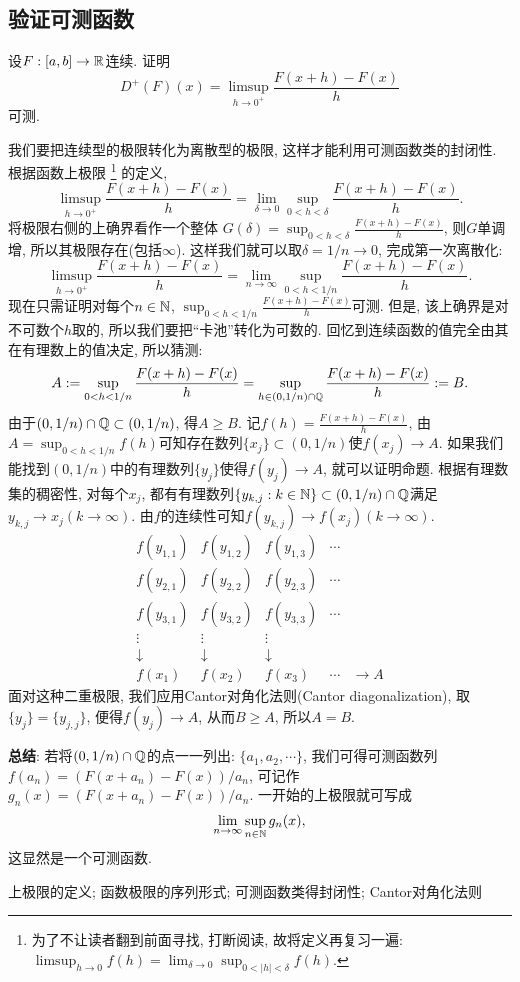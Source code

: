 \subsection{验证可测函数}
\begin{example}[~(Dini导数)] %
    设$F: [a,b] \to \mathbb{R}$连续. 证明
    $$D^+(F)(x) = \limsup_{h \to 0^+}\frac{F(x+h)-F(x)}{h}$$
    可测. 
\end{example}
\begin{solution}
    我们要把连续型的极限转化为离散型的极限, 这样才能利用可测函数类的封闭性. 根据函数上极限
    \footnote{为了不让读者翻到前面寻找, 打断阅读, 故将定义再复习一遍: $\limsup_{h \to 0}f(h) = \lim_{\delta \to  0} \sup_{0<|h|<\delta} f(h)$.}
    的定义,
    $$\limsup_{h \to 0^+}\frac{F(x+h)-F(x)}{h} = 
    \lim_{\delta \to 0}\sup_{0<h<\delta}\frac{F(x+h)-F(x)}{h}.$$
    将极限右侧的上确界看作一个整体
    $\displaystyle{G(\delta)=\sup_{0<h<\delta}\frac{F(x+h)-F(x)}{h} }$, 则$G$单调增, 所以其极限存在(包括$\infty$). 这样我们就可以取$\delta=1/n \to 0$, 完成第一次离散化:
    $$\limsup_{h \to 0^+}\frac{F(x+h)-F(x)}{h} = 
    \lim_{n \to \infty}\sup_{0<h<1/n}\frac{F(x+h)-F(x)}{h}.$$
    现在只需证明对每个$n \in \mathbb{N}$, $\displaystyle{\sup_{0<h<1/n}\frac{F(x+h)-F(x)}{h}}$可测.
    但是, 该上确界是对不可数个$h$取的, 所以我们要把“卡池”转化为可数的. 回忆到连续函数的值完全由其在有理数上的值决定, 所以猜测:
    $$A := \sup_{0<h<1/n}\frac{F(x+h)-F(x)}{h}=\sup_{h \in (0, 1/n) \cap \mathbb{Q}}
    \frac{F(x+h)-F(x)}{h} := B.$$
    由于$(0,1/n)\cap \mathbb{Q} \subset (0, 1/n)$, 得$A \geq B$. 
    记$\displaystyle{f(h)=\frac{F(x+h)-F(x)}{h}}$, 由$A=\sup_{0<h<1/n}f(h)$可知存在数列$\{x_j\} \subset (0,1/n)$使$f(x_j) \to A$. 如果我们能找到$(0,1/n)$中的有理数列$\{y_j\}$使得$f(y_j) \to A$, 就可以证明命题. 根据有理数集的稠密性, 对每个$x_j$, 都有有理数列$\{y_{k,j}:k \in \mathbb{N} \} \subset (0, 1/n) \cap \mathbb{Q}$满足$y_{k,j} \to x_j (k \to \infty)$. 由$f$的连续性可知$f(y_{k,j}) \to f(x_j) (k \to \infty)$. 
    $$\begin{matrix}
        f(y_{1,1}) & f(y_{1,2}) & f(y_{1,3}) & \cdots & \\
        f(y_{2,1}) & f(y_{2,2}) & f(y_{2,3}) & \cdots & \\
        f(y_{3,1}) & f(y_{3,2}) & f(y_{3,3}) & \cdots & \\
        \vdots  & \vdots  & \vdots  &  \\
        \downarrow & \downarrow & \downarrow &  \\
        f(x_1)     & f(x_2)     & f(x_3)     & \cdots & \to A
    \end{matrix}$$
    面对这种二重极限, 我们应用Cantor对角化法则(Cantor diagonalization), 取$\{y_j\}=\{y_{j,j}\}$, 便得$f(y_{j}) \to A$, 从而$B\geq A$, 所以$A=B$. 
\end{solution}
\textbf{总结}: 
    若将$(0,1/n) \cap \mathbb{Q}$的点一一列出: $\{a_1, a_2, \cdots\}$, 我们可得可测函数列
    $f(a_n)=(F(x+a_n)-F(x))/a_n$, 可记作$g_n(x)=(F(x+a_n)-F(x))/a_n$. 一开始的上极限就可写成
    $$\lim_{n\to \infty}\sup_{n \in \mathbb{N}} g_n(x),$$
    这显然是一个可测函数. 
    
\begin{knowledge}
    上极限的定义; 函数极限的序列形式; 可测函数类得封闭性; Cantor对角化法则
\end{knowledge}